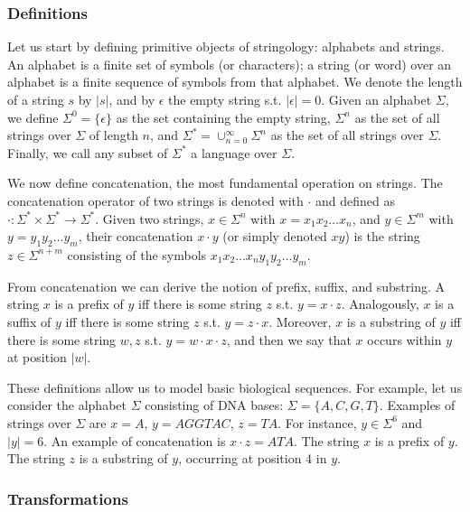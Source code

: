 \subsubsection{Definitions}

Let us start by defining primitive objects of stringology: alphabets and strings. An alphabet is a finite set of symbols (or characters); a string (or word) over an alphabet is a finite sequence of symbols from that alphabet. We denote the length of a string $s$ by $\left| s \right|$, and by $\epsilon$ the empty string s.t. $\left| \epsilon \right|=0$.
Given an alphabet $\Sigma$, we define $\Sigma^0=\{ \epsilon \}$ as the set containing the empty string, $\Sigma^n$ as the set of all strings over $\Sigma$ of length $n$, and $\Sigma^* = \cup_{n=0}^{\infty}{\Sigma^n}$ as the set of all strings over $\Sigma$. Finally, we call any subset of $\Sigma^*$ a language over $\Sigma$.

We now define concatenation, the most fundamental operation on strings. The concatenation operator of two strings is denoted with $\cdot$ and defined as $\cdot : \Sigma^* \times \Sigma^* \rightarrow \Sigma^*$. Given two strings, $x \in \Sigma^n$ with $x=x_1 x_2 \dots x_n$, and $y \in \Sigma^m$ with $y=y_1 y_2 \dots y_m$, their concatenation $x \cdot y$ (or simply denoted $xy$) is the string $z \in \Sigma^{n+m}$ consisting of the symbols $x_1 x_2 \dots x_n y_1 y_2 \dots y_m$.

From concatenation we can derive the notion of prefix, suffix, and substring.
A string $x$ is a prefix of $y$ iff there is some string $z$ s.t. $y=x\cdot z$.
Analogously, $x$ is a suffix of $y$ iff there is some string $z$ s.t. $y=z\cdot x$.
Moreover, $x$ is a substring of $y$ iff there is some string $w,z$ s.t. $y=w\cdot x \cdot z$, and then we say that $x$ occurs within $y$ at position $|w|$.

These definitions allow us to model basic biological sequences. For example, let us consider the alphabet $\Sigma$ consisting of DNA bases: $\Sigma = \{A,C,G,T\}$. Examples of strings over $\Sigma$ are $x=A$, $y=AGGTAC$, $z=TA$. For instance, $y \in \Sigma^6$ and $\left| y \right| = 6$. An example of concatenation is $x \cdot z = ATA$. The string $x$ is a prefix of $y$. The string $z$ is a substring of $y$, occurring at position 4 in $y$.

\subsubsection{Transformations}

